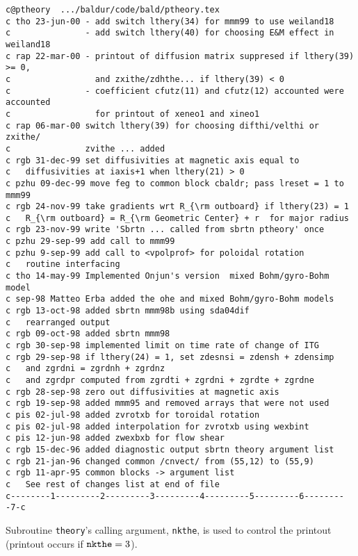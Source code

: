 \begin{verbatim}
c@ptheory  .../baldur/code/bald/ptheory.tex
c tho 23-jun-00 - add switch lthery(34) for mmm99 to use weiland18 
c               - add switch lthery(40) for choosing E&M effect in weiland18
c rap 22-mar-00 - printout of diffusion matrix suppresed if lthery(39) >= 0,
c                 and zxithe/zdhthe... if lthery(39) < 0
c               - coefficient cfutz(11) and cfutz(12) accounted were accounted
c                 for printout of xeneo1 and xineo1
c rap 06-mar-00 switch lthery(39) for choosing difthi/velthi or zxithe/
c               zvithe ... added
c rgb 31-dec-99 set diffusivities at magnetic axis equal to
c   diffusivities at iaxis+1 when lthery(21) > 0
c pzhu 09-dec-99 move feg to common block cbaldr; pass lreset = 1 to mmm99
c rgb 24-nov-99 take gradients wrt R_{\rm outboard} if lthery(23) = 1
c   R_{\rm outboard} = R_{\rm Geometric Center} + r  for major radius
c rgb 23-nov-99 write 'Sbrtn ... called from sbrtn ptheory' once
c pzhu 29-sep-99 add call to mmm99
c pzhu 9-sep-99 add call to <vpolprof> for poloidal rotation
c   routine interfacing
c tho 14-may-99 Implemented Onjun's version  mixed Bohm/gyro-Bohm model
c sep-98 Matteo Erba added the ohe and mixed Bohm/gyro-Bohm models
c rgb 13-oct-98 added sbrtn mmm98b using sda04dif
c   rearranged output
c rgb 09-oct-98 added sbrtn mmm98
c rgb 30-sep-98 implemented limit on time rate of change of ITG
c rgb 29-sep-98 if lthery(24) = 1, set zdesnsi = zdensh + zdensimp
c   and zgrdni = zgrdnh + zgrdnz
c   and zgrdpr computed from zgrdti + zgrdni + zgrdte + zgrdne
c rgb 28-sep-98 zero out diffusivities at magnetic axis
c rgb 19-sep-98 added mmm95 and removed arrays that were not used
c pis 02-jul-98 added zvrotxb for toroidal rotation
c pis 02-jul-98 added interpolation for zvrotxb using wexbint
c pis 12-jun-98 added zwexbxb for flow shear
c rgb 15-dec-96 added diagnostic output sbrtn theory argument list
c rgb 21-jan-96 changed common /cnvect/ from (55,12) to (55,9)
c rgb 11-apr-95 common blocks -> argument list
c   See rest of changes list at end of file
c--------1---------2---------3---------4---------5---------6---------7-c
\end{verbatim}

Subroutine {\tt theory}'s calling argument,
{\tt nkthe}, is used to control the printout
(printout occurs if ${\tt nkthe} = 3$).

